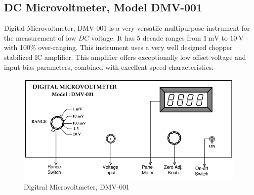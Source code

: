 \documentclass[%
 aip,
 amsmath,amssymb,
 reprint,%
]{revtex4-1}
\begin{document}
\subsection{DC Microvoltmeter, Model DMV-001}
Digital Microvoltmeter, DMV-001 is a very versatile multipurpose instrument
for the measurement of low $DC$ voltage. It has 5 decade ranges from $\SI{1}{\milli \volt}$ to $\SI{10}{\volt}$ with
100\% over-ranging. This instrument uses a very well designed chopper stabilized IC amplifier.
This amplifier offers exceptionally low offset voltage and input bias parameters,
combined with excellent speed characteristics.
\begin{figure}
    \centering
    \includegraphics[scale = 0.8]{Figures/dmv-001.png}
    \caption{Digitral Microvoltmeter, DMV-001}
    \label{fig:dmv}
\end{figure}
\end{document}
